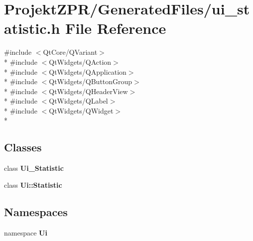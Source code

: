 \section{Projekt\-Z\-P\-R/\-Generated\-Files/ui\-\_\-statistic.h File Reference}
\label{ui__statistic_8h}
{\ttfamily \#include $<$Qt\-Core/\-Q\-Variant$>$}\\*
{\ttfamily \#include $<$Qt\-Widgets/\-Q\-Action$>$}\\*
{\ttfamily \#include $<$Qt\-Widgets/\-Q\-Application$>$}\\*
{\ttfamily \#include $<$Qt\-Widgets/\-Q\-Button\-Group$>$}\\*
{\ttfamily \#include $<$Qt\-Widgets/\-Q\-Header\-View$>$}\\*
{\ttfamily \#include $<$Qt\-Widgets/\-Q\-Label$>$}\\*
{\ttfamily \#include $<$Qt\-Widgets/\-Q\-Widget$>$}\\*
\subsection*{Classes}
\begin{DoxyCompactItemize}
\item 
class {\bf Ui\-\_\-\-Statistic}
\item 
class {\bf Ui\-::\-Statistic}
\end{DoxyCompactItemize}
\subsection*{Namespaces}
\begin{DoxyCompactItemize}
\item 
namespace {\bf Ui}
\end{DoxyCompactItemize}
